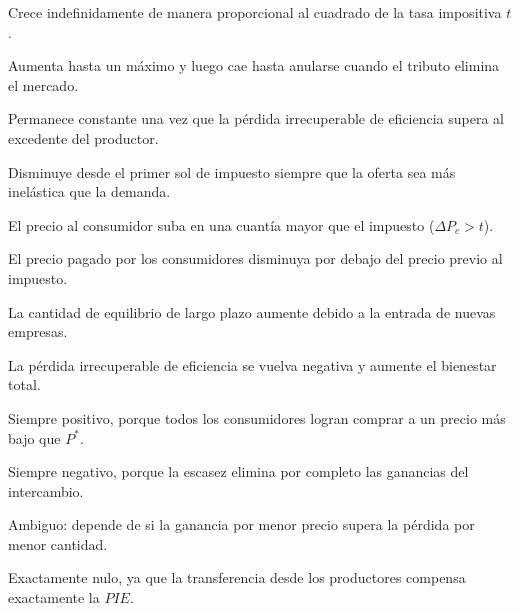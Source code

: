 \begin{opts}
    \item Crece indefinidamente de manera proporcional al cuadrado de la tasa impositiva $t$.
    \item Aumenta hasta un máximo y luego cae hasta anularse cuando el tributo elimina el mercado.
    \item Permanece constante una vez que la pérdida irrecuperable de eficiencia supera al excedente del productor.
    \item Disminuye desde el primer sol de impuesto siempre que la oferta sea más inelástica que la demanda.
\end{opts}

\begin{opts}
    \item El precio al consumidor suba en una cuantía mayor que el impuesto ($\Delta P_c > t$).
    \item El precio pagado por los consumidores disminuya por debajo del precio previo al impuesto.
    \item La cantidad de equilibrio de largo plazo aumente debido a la entrada de nuevas empresas.
    \item La pérdida irrecuperable de eficiencia se vuelva negativa y aumente el bienestar total.
\end{opts}

\begin{opts}
    \item Siempre positivo, porque todos los consumidores logran comprar a un precio más bajo que $P^*$.
    \item Siempre negativo, porque la escasez elimina por completo las ganancias del intercambio.
    \item Ambiguo: depende de si la ganancia por menor precio supera la pérdida por menor cantidad.
    \item Exactamente nulo, ya que la transferencia desde los productores compensa exactamente la $PIE$.
\end{opts}

